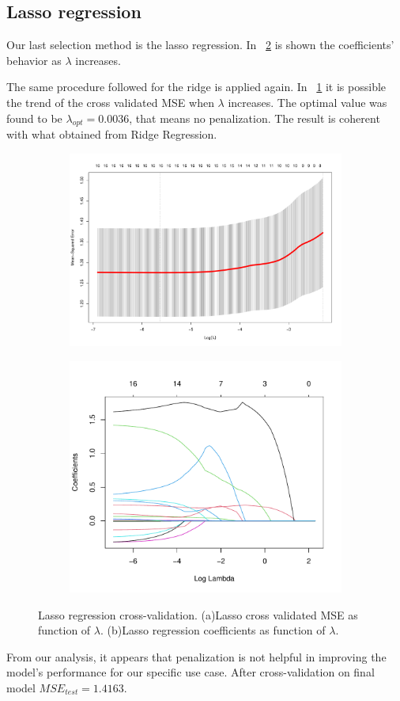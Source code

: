 \subsection{Lasso regression}

Our last selection method is the lasso regression. In \Fig~\ref{fig:LassoCoefVsLambda} is shown the coefficients' behavior as $\lambda$ increases. 



The same procedure followed for the ridge is applied again. In \Fig~\ref{fig:LassoCvPlot} it is possible the trend of the cross validated MSE when $\lambda$ increases. The optimal value was found to be $\lambda_{opt} = 0.0036$, that means no penalization. The result is coherent with what obtained from Ridge Regression.

\begin{figure}[h]
	\centering
	\begin{subfigure}{.6\textwidth}
		\centering
		\includegraphics[width=0.5\linewidth]{ImageFiles/Regression/Lasso/LassoCvPlot.pdf}
		\caption{}
		\label{fig:LassoCvPlot}
	\end{subfigure}%
	\begin{subfigure}{.6\textwidth}
		\centering
		\includegraphics[width=0.5\linewidth]{ImageFiles/Regression/Lasso/LassoCoefVsLambda.pdf}
		\caption{}
		\label{fig:LassoCoefVsLambda}
	\end{subfigure}
	\caption{Lasso regression cross-validation. (a)Lasso cross validated MSE as function of $\lambda$. (b)Lasso regression coefficients as function of $\lambda$.}
	\label{fig:FinalFSSM}
\end{figure}
From our analysis, it appears that penalization is not helpful in improving the model's performance for our specific use case.
After cross-validation on final model $MSE_{test} = 1.4163$.